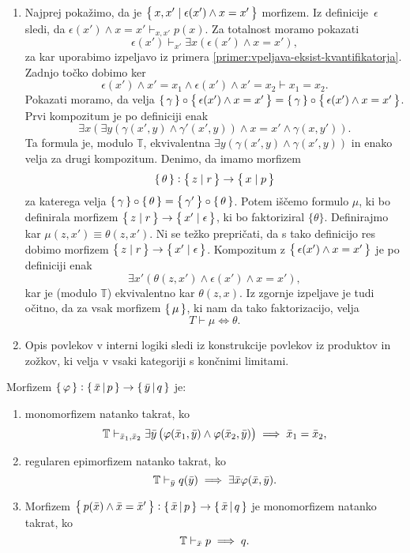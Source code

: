 \documentclass[../kategoricna_logika.tex]{subfiles}
\begin{document}
\begin{dokaz}
\begin{enumerate}[label=(\roman*)]
  \item Najprej pokažimo, da je
    $\left\lbrace\,x,x' \mid \epsilon(x') \land x = x'\,\right\rbrace$ morfizem.  Iz
    definicije~$\epsilon$ sledi, da
    $\epsilon(x') \land x = x' \vdash_{x,x'} p(x)$.  Za totalnost
    moramo pokazati
    \[ \epsilon(x') \vdash_{x'} \exists x (\epsilon(x') \land x=x'),\]
    za kar uporabimo izpeljavo iz primera
    \ref{primer:vpeljava-eksist-kvantifikatorja}.  Zadnjo točko dobimo
    ker
    \[\epsilon(x') \land x'=x_1 \land \epsilon(x') \land x'= x_2
      \vdash x_1 = x_2.\] Pokazati moramo, da velja
    $\left\lbrace\,\gamma\,\right\rbrace \circ \left\lbrace\,\epsilon(x') \land x = x'\,\right\rbrace = \left\lbrace\,\gamma\,\right\rbrace
    \circ \left\lbrace\,\epsilon(x') \land x = x'\,\right\rbrace$.  Prvi kompozitum je po
    definiciji enak
    \[\exists x( \exists y(\gamma(x',y) \land \gamma'(x',y)) \land x =
      x' \land \gamma(x,y')). \] Ta formula je, modulo $\mathbb{T}$,
    ekvivalentna $\exists y(\gamma(x',y) \land \gamma(x',y))$ in enako
    velja za drugi kompozitum.  Denimo, da imamo morfizem
    \[\left\lbrace\,\theta\,\right\rbrace : \left\lbrace\,z \mid r\,\right\rbrace \to \left\lbrace\,x \mid p\,\right\rbrace\]
    za katerega velja
    $\left\lbrace\,\gamma\,\right\rbrace \circ \left\lbrace\,\theta\,\right\rbrace = \left\lbrace\,\gamma'\,\right\rbrace \circ
    \left\lbrace\,\theta\,\right\rbrace$.  Potem iščemo formulo $\mu$, ki bo definirala
    morfizem $\left\lbrace\,z \mid r\,\right\rbrace \to \left\lbrace\,x' \mid \epsilon\,\right\rbrace$, ki bo
    faktoriziral $\{ \theta\}$.  Definirajmo kar
    $\mu(z,x') \equiv \theta(z,x')$. Ni se težko prepričati,
    da s tako definicijo res dobimo morfizem
    $\left\lbrace\,z \mid r\,\right\rbrace \to \left\lbrace\,x' \mid \epsilon\,\right\rbrace$.  Kompozitum z
    $\left\lbrace\,\epsilon(x') \land x = x'\,\right\rbrace$ je po definiciji enak
    \[ \exists x' (\theta(z,x') \land \epsilon(x') \land x=x'),\] kar
    je (modulo $\mathbb{T}$) ekvivalentno kar $\theta(z,x)$.  Iz
    zgornje izpeljave je tudi očitno, da za vsak morfizem $\left\lbrace\,\mu\,\right\rbrace$,
    ki nam da tako faktorizacijo, velja
    \[T \vdash \mu \iff \theta.\]

  \item Opis povlekov v interni logiki sledi iz konstrukcije povlekov
    iz produktov in zožkov, ki velja v vsaki kategoriji s končnimi
    limitami.
  \end{enumerate}
\end{dokaz}
\begin{lema}\label{lema:morfizmi-v-sintakticni-kategoriji}
  Morfizem
  $\left\lbrace\,\varphi\,\right\rbrace : \left\lbrace\,\bar{x}\,\middle|\, p\,\right\rbrace \to
  \left\lbrace\,\bar{y}\,\middle|\, q\,\right\rbrace$ je:
  \begin{enumerate}[label=(\roman*)]
  \item monomorfizem natanko takrat, ko
      $$\mathbb{T} \vdash_{\bar{x}_1,\bar{x}_2}  \exists \bar{y} \left( \varphi(\bar{x}_1,\bar{y}) \wedge \varphi(\bar{x}_2,\bar{y}) \right) \implies \bar{x}_1 = \bar{x}_2 ,$$
    \item regularen epimorfizem natanko takrat, ko
      $$\mathbb{T} \vdash_{\bar{y}} q(\bar{y}) \implies \exists \bar{x} \varphi(\bar{x},\bar{y}).$$
    \item Morfizem
      $\left\lbrace\,p(\bar{x}) \wedge \bar{x} = \bar{x}'\,\right\rbrace :
      \left\lbrace\,\bar{x}\,\middle|\, p \,\right\rbrace \to \left\lbrace\,\bar{x}\,\middle|\, q\,\right\rbrace$ je
      monomorfizem natanko takrat, ko
      $$\mathbb{T} \vdash_{\bar{x}} p \implies q.$$
    \end{enumerate}
  \end{lema}
\end{document}
